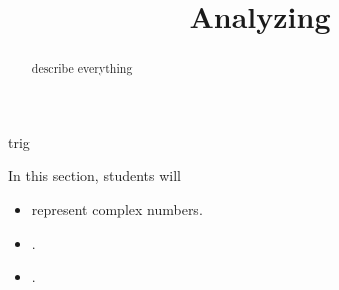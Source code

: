 \documentclass{ximera}
\title{Analyzing}
\begin{document}
\begin{abstract}
describe everything
\end{abstract}
\maketitle








trig



\begin{sectionOutcomes}
In this section, students will 

\begin{itemize}
\item represent complex numbers.
\item .
\item .
\end{itemize}
\end{sectionOutcomes}
\end{document}
